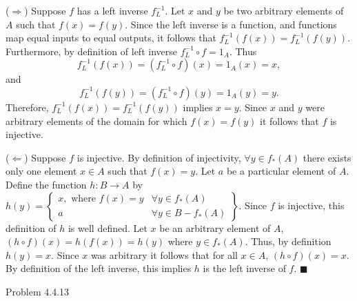 \documentclass{article}
\theoremstyle{definition}
\begin{document}
	($\Rightarrow$)  Suppose $f$ has a left inverse $f_L^{-1}$. Let $x$
	and $y$ be two arbitrary elements of $A$ such that $f(x)=f(y)$.
	Since the left inverse is a function, and functions map equal inputs
	to equal outputs, it follows that $f_L^{-1}(f(x))=f_L^{-1}(f(y))$.
	Furthermore, by definition of left inverse $f_L^{-1}\circ f=1_A$.
	Thus  $$f_L^{-1}(f(x))=(f_L^{-1}\circ f)(x)=1_A(x)=x,$$ and
	$$f_L^{-1}(f(y))=(f_L^{-1}\circ f)(y)=1_A(y)=y.$$  Therefore, $f_L^{-1}(f(x))=f_L^{-1}(f(y))$ implies
	$x=y$. Since $x$ and $y$ were arbitrary elements of the domain for
	which $f(x)=f(y)$ it follows that $f$ is injective.

	\vspace{0.15cm}

	($\Leftarrow$)  Suppose $f$ is injective. By definition of
	injectivity, $\forall y\in f_*(A)$ there exists only one element
	$x\in A$ such that $f(x)=y$. Let $a$ be a particular element of
	$A$. Define the function $h:B\rightarrow A$ by
	$h(y)=\left\{\begin{array}{cc}
					 x,\mbox{ where }f(x)=y & \forall y\in
					 f_*(A)\\ a & \forall y\in B-f_*(A)
	\end{array}\right\}$. Since $f$ is
	injective, this definition of $h$ is well defined. Let $x$ be an
	arbitrary element of $A$, $(h\circ f)(x)=h(f(x))=h(y)$ where $y\in
	f_*(A)$. Thus, by definition $h(y)=x$. Since $x$ was arbitrary it
	follows that for all $x\in A$, $(h\circ f)(x)=x$. By definition of
	the left inverse, this implies $h$ is the left inverse of $f$.
	$\blacksquare$

	\vspace{1cm}



	\noindent Problem 4.4.13  \vspace{0.3cm}
\end{document}
